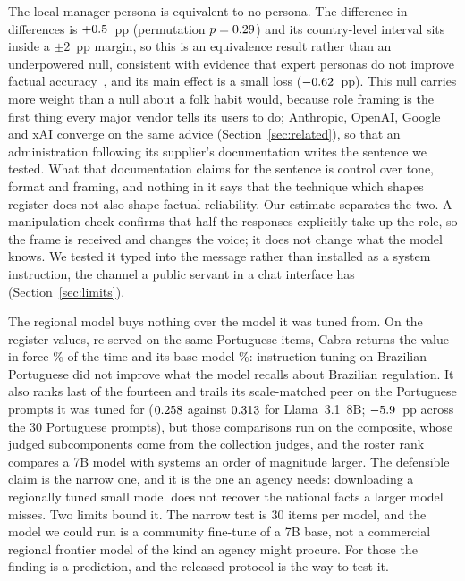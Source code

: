 The local-manager persona is equivalent to no persona. The
difference-in-differences is $+0.5$~pp (permutation $p=0.29$) and its
country-level interval sits inside a $\pm2$~pp margin, so this is an
equivalence result rather than an underpowered null, consistent with evidence
that expert personas do not improve factual
accuracy~\citep{zheng2024helpful,mollick2025personas}, and its main effect is a
small loss ($-0.62$~pp). This null carries more weight than a null
about a folk habit would, because role framing is the first thing every major
vendor tells its users to do; Anthropic, OpenAI, Google and xAI converge on the
same advice (Section~\ref{sec:related}), so that an administration following
its supplier's documentation writes the sentence we tested. What that
documentation claims for the sentence is control over tone, format and framing,
and nothing in it says that the technique which shapes register does not also
shape factual reliability. Our estimate separates the two. A manipulation check
confirms that half the responses explicitly take up the role, so the frame is
received and changes the voice; it does not change what the model knows. We
tested it typed into the message rather than installed as a system
instruction, the channel a public servant in a chat interface has
(Section~\ref{sec:limits}).

The regional model buys nothing over the model it was tuned from. On the
register values, re-served on the same Portuguese items, Cabra returns the value
in force \ncabsanitycabra\% of the time and its base model
\ncabsanitybase\%: instruction tuning on Brazilian Portuguese did not improve
what the model recalls about Brazilian regulation. It also ranks last of the
fourteen and trails its scale-matched peer on the Portuguese prompts it was
tuned for ($0.258$ against $0.313$ for Llama~3.1~8B;
$-5.9$~pp across the 30 Portuguese prompts), but those comparisons run
on the composite, whose judged subcomponents come from the collection judges,
and the roster rank compares a 7B model with systems an order of magnitude
larger. The defensible claim is the narrow one, and it is the one an agency
needs: downloading a regionally tuned small model does not recover the national
facts a larger model misses. Two limits bound it. The narrow test is 30 items
per model, and the model we could run is a community fine-tune of a 7B base, not
a commercial regional frontier model of the kind an agency might procure. For those the finding is a prediction, and the released protocol
is the way to test it.

